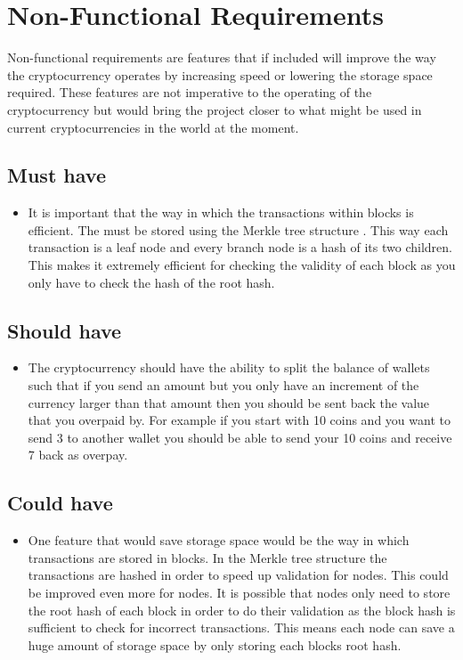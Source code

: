 \documentclass{l4proj}
\begin{document}
\section{Non-Functional Requirements}
Non-functional requirements are features that if included will improve the way the cryptocurrency operates by increasing
speed or lowering the storage space required. These features are not imperative to the operating of the cryptocurrency
but would bring the project closer to what might be used in current cryptocurrencies in the world at the moment.

\subsection{Must have}
\begin{itemize}
    \item It is important that the way in which the transactions within blocks is efficient. The must be stored using the Merkle
    tree structure \citep{merkle1987digital}. This way each transaction is a leaf node and every branch node is a hash of its two children.
    This makes it extremely efficient for checking the validity of each block as you only have to check the hash of the root
    hash.
\end{itemize}


\subsection{Should have}
\begin{itemize}
    \item The cryptocurrency should have the ability to split the balance of wallets such that if you send an amount but you only
    have an increment of the currency larger than that amount then you should be sent back the value that you overpaid by.
    For example if you start with 10 coins and you want to send 3 to another wallet you should be able to send your 10 coins
    and receive 7 back as overpay.    
\end{itemize}

\subsection{Could have}
\begin{itemize}
    \item One feature that would save storage space would be the way in which transactions are stored in blocks. In the Merkle tree
    structure the transactions are hashed in order to speed up validation for nodes. This could be improved even more for 
    nodes. It is possible that nodes only need to store the root hash of each block in order to do their validation as the
    block hash is sufficient to check for incorrect transactions. This means each node can save a huge amount of storage space
    by only storing each blocks root hash.
\end{itemize}
\end{document}
